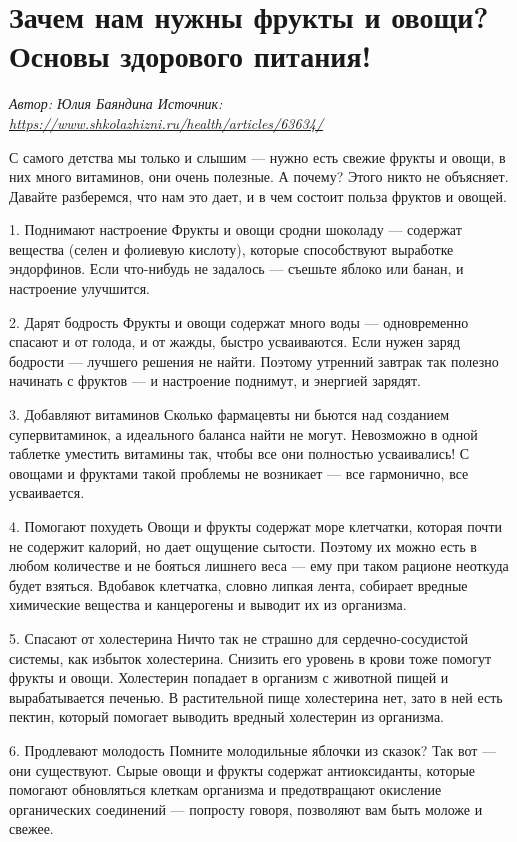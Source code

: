 \section{Зачем нам нужны фрукты и овощи? Основы здорового питания!}
\textit{Автор: Юлия Баяндина
    Источник: \url{https://www.shkolazhizni.ru/health/articles/63634/}}

С самого детства мы только и слышим — нужно есть свежие фрукты и овощи, в них много витаминов, они очень полезные. А почему? Этого никто не объясняет. Давайте разберемся, что нам это дает, и в чем состоит польза фруктов и овощей.

1. Поднимают настроение
Фрукты и овощи сродни шоколаду — содержат вещества (селен и фолиевую кислоту), которые способствуют выработке эндорфинов. Если что-нибудь не задалось — съешьте яблоко или банан, и настроение улучшится.

2. Дарят бодрость Фрукты и овощи содержат много воды — одновременно спасают и от голода, и от жажды, быстро усваиваются. Если нужен заряд бодрости — лучшего решения не найти. Поэтому утренний завтрак так полезно начинать с фруктов — и настроение поднимут, и энергией зарядят.

3. Добавляют витаминов Сколько фармацевты ни бьются над созданием супервитаминок, а идеального баланса найти не могут. Невозможно в одной таблетке уместить витамины так, чтобы все они полностью усваивались! С овощами и фруктами такой проблемы не возникает — все гармонично, все усваивается.

4. Помогают похудеть Овощи и фрукты содержат море клетчатки, которая почти не содержит калорий, но дает ощущение сытости. Поэтому их можно есть в любом количестве и не бояться лишнего веса — ему при таком рационе неоткуда будет взяться. Вдобавок клетчатка, словно липкая лента, собирает вредные химические вещества и канцерогены и выводит их из организма.

5. Спасают от холестерина Ничто так не страшно для сердечно-сосудистой системы, как избыток холестерина. Снизить его уровень в крови тоже помогут фрукты и овощи. Холестерин попадает в организм с животной пищей и вырабатывается печенью. В растительной пище холестерина нет, зато в ней есть пектин, который помогает выводить вредный холестерин из организма.

6. Продлевают молодость Помните молодильные яблочки из сказок? Так вот — они существуют. Сырые овощи и фрукты содержат антиоксиданты, которые помогают обновляться клеткам организма и предотвращают окисление органических соединений — попросту говоря, позволяют вам быть моложе и свежее.

